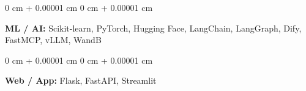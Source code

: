 \documentclass[10pt, letterpaper]{article}
\newenvironment{onecolentry}{
    \begin{adjustwidth}{
        0 cm + 0.00001 cm
    }{
        0 cm + 0.00001 cm
    }
}{
    \end{adjustwidth}
} %
\begin{document}
        \vspace{0.10 cm}
        \begin{onecolentry}
            \textbf{ML / AI:} Scikit-learn, PyTorch, Hugging Face, LangChain, LangGraph, Dify, FastMCP, vLLM, WandB
        \end{onecolentry}

        \vspace{0.10 cm}
        \begin{onecolentry}
            \textbf{Web / App:} Flask, FastAPI, Streamlit
        \end{onecolentry}
\end{document}

